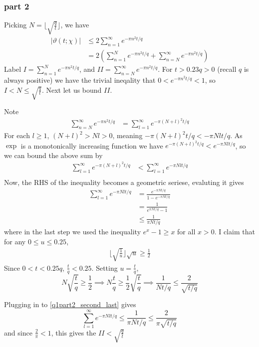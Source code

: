 \documentclass{article}
\theoremstyle{definition}
\theoremstyle{definition}
\theoremstyle{remark}
\renewcommand{\t}{\vartheta}
\newcommand{\x}{\chi}
\begin{document}
\subsubsection*{part 2}
Picking $N = \lfloor \sqrt{\frac{q}{t}}\rfloor$, we have
\begin{align}
	|\t(t; \x) |
	&\leq 2 \sum_{n = 1}^{\infty} e^{-\pi n^2 t/q}  \\
	& = 2 \left( \sum_{n = 1}^{N} e^{-\pi n^2 t/q}
	+ \sum_{n = N}^{\infty} e^{-\pi n^2 t/q} \right)  \label{q1part2_I_II}
\end{align}
Label $I =  \sum_{n = 1}^{N} e^{-\pi n^2 t/q}$, and $II =  \sum_{n = N}^{\infty} e^{-\pi n^2 t/q}$.
For $t > 0.23 q > 0$ (recall $q$ is always positive) we have the trivial ineqality that $0 < e^{-\pi n^2 t / q} < 1$, so $I < N \leq \sqrt{\frac{q}{t}}$. 
Next let us bound $II$.

Note 
\begin{align}
	\sum_{n = N}^{\infty} e^{-\pi n^2 t/q} 
	&= \sum_{l = 1}^{\infty} e^{-\pi (N + l)^2 t/q} 
\end{align}
For each $l \geq 1$, $(N + l)^2 > Nl > 0$, meaning $-\pi (N + l)^2 t/q < -\pi Nl t/q$. 
As $\exp$ is a monotonically increasing function we have $e^{-\pi (N + l)^2 t/q} < e^{-\pi Nl t/q}$, so we can bound the above sum by
\begin{align}
	\sum_{l = 1}^{\infty} e^{-\pi (N + l)^2 t/q} 
	&< \sum_{l = 1}^{\infty} e^{-\pi Nl t/q} \\
\end{align}
Now, the RHS of the inequality becomes a geometric seriese, evaluting it gives 
\begin{align}
	\sum_{l = 1}^{\infty} e^{-\pi Nl t/q} 
	&= \frac{e^{-\pi N t/q}}{1 - e^{-\pi N t/q}} \\
	&= \frac{1}{e^{\pi N t/q} - 1} \\
	&\leq \frac{1}{\pi N t/q} \label{q1part2_second_last}
\end{align}
where in the last step we used the inequality $e^x - 1 \geq x$ for all $x > 0$.
I claim that for any $0 \leq u \leq 0.25$, 
\begin{align}\label{q1part2_key}
	\lfloor \sqrt{\frac{1}{u}}\rfloor \sqrt{u}  \geq \frac{1}{2}
\end{align}
Since $0 <t < 0.25 q$, $\frac{t}{q} < 0.25$.
Setting $u = \frac{t}{q}$,
$$
N \sqrt{\frac{t}{q}} \geq \frac{1}{2} \implies N \frac{t}{q} \geq \frac{1}{2} \sqrt{\frac{t}{q}} \implies \frac{1}{N t /q} \leq \frac{2}{\sqrt{t/q}}
$$

Plugging in to \eqref{q1part2_second_last} gives 
$$
\sum_{l = 1}^{\infty} e^{-\pi Nl t/q} \leq \frac{1}{\pi N t/q} \leq \frac{2}{\pi \sqrt{ t/q}}
$$
and since $\frac{2}{\pi} < 1$, this gives the $II < \sqrt{\frac{q}{t}}$
\end{document}
